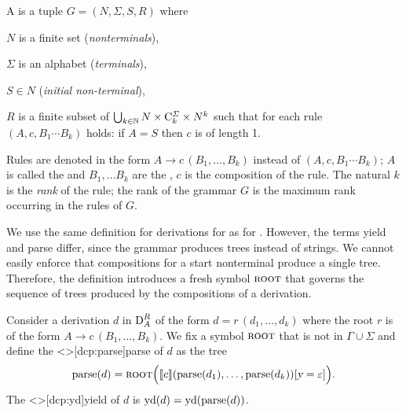 \documentclass[../document.tex]{subfiles}
\begin{document}
    \begin{definition}
        A %
        is a tuple \(G=(N, \varSigma, S, R)\) where
        \begin{compactenum}[(i)]
            \item \(N\) is a finite set (\emph{nonterminals}),
            \item \(\varSigma\) is an alphabet (\emph{terminals}),
            \item \(S \in N\) (\emph{initial non-terminal}),
            \item \(R\) is a finite subset of \(\bigcup_{k \in \mathbb{N}} N \times \mathrm{C}^\varSigma_k \times N^k\) such that for each rule \((A, c, B_1\cdots B_k)\) holds: if \(A = S\) then \(c\) is of length 1.
        \end{compactenum}

        Rules are denoted in the form \(A \to c\,(B_1, \ldots, B_k)\) instead of \((A, c, B_1 \cdots B_k)\); \(A\) is called the  and \(B_1, \ldots B_k\) are the , \(c\) is the composition of the rule.
        The natural \(k\) is the \emph{rank} of the rule; the rank of the grammar \(G\) is the maximum rank occurring in the rules of \(G\).
    \end{definition}


    We use the same definition for derivations for  as for .
    However, the terms yield and parse differ, since the grammar produces trees instead of strings.
    We cannot easily enforce that compositions for a start nonterminal produce a single tree.
    Therefore, the definition introduces a fresh symbol \(\textsc{root}\) that governs the sequence of trees produced by the compositions of a derivation.

    \begin{definition}
        Consider a derivation \(d\) in \(\operatorname{D}^R_A\) of the form \(d = r\,(d_1, \ldots, d_k)\) where the root \(r\) is of the form \(A \to c\,(B_1, \ldots, B_k)\).
        We fix a symbol \(\textsc{root}\) that is not in \(\varGamma \cup \varSigma\) and define the <\dcp>[dcp:parse]{parse} of \(d\) as the tree \[
            \operatorname{parse}(d) = \textsc{root}\Big( \llbracket c\rrbracket(\operatorname{parse}(d_1),\ldots,\operatorname{parse}(d_k))[\textsl{y}=\varepsilon]\Big) \text{.}
        \]
        The <\dcp>[dcp:yd]{yield} of \(d\) is \(\operatorname{yd}(d) = \operatorname{yd}(\operatorname{parse}(d))\).
    \end{definition}
\end{document}
